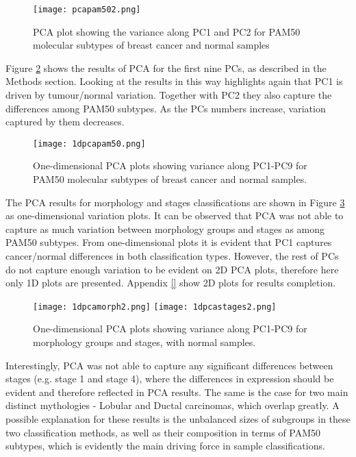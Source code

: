             \begin{figure}[!h]
            \centering
            \texttt{[image: pcapam502.png]} 
            \caption{PCA plot showing the variance along PC1 and PC2 for PAM50 molecular subtypes of breast cancer and normal samples}
            \label{fig:pcapam50}
            \end{figure}
            
    \newpage
    Figure \ref{fig:1dpcapam50} shows the results of PCA for the first nine PCs, as described in the Methods section. Looking at the results in this way highlights again that PC1 is driven by tumour/normal variation. Together with PC2 they also capture the differences among PAM50 subtypes. As the PCs numbers increase, variation captured by them decreases. 
    
            \begin{figure}[!h]
            \centering
            \texttt{[image: 1dpcapam50.png]}
            \caption{One-dimensional PCA plots showing variance along PC1-PC9 for PAM50 molecular subtypes of breast cancer and normal samples. }
            \label{fig:1dpcapam50}
            \end{figure}
    
    
    The PCA results for morphology and stages classifications are shown in Figure \ref{fig:1dpcamorphstage} as one-dimensional variation plots. It can be observed that PCA was not able to capture as much variation between morphology groups and stages as among PAM50 subtypes. From one-dimensional plots it is evident that PC1 captures cancer/normal differences in both classification types. However, the rest of PCs do not capture enough variation to be evident on 2D PCA plots, therefore here only 1D plots are presented. Appendix \ref{} show 2D plots for results completion.    
    
            
            \begin{figure}[!h]
            \texttt{[image: 1dpcamorph2.png]}\hfill
            \texttt{[image: 1dpcastages2.png]}
            \caption{One-dimensional PCA plots showing variance along PC1-PC9 for morphology groups and stages, with normal samples.}
            \label{fig:1dpcamorphstage}
            \end{figure}
            
    
    \newpage
    Interestingly, PCA was not able to capture any significant differences between stages (e.g. stage 1 and stage 4), where the differences in expression should be evident and therefore reflected in PCA results. The same is the case for two main distinct mythologies - Lobular and Ductal carcinomas, which overlap greatly. A possible explanation for these results is the unbalanced sizes of subgroups in these two classification methods, as well as their composition in terms of PAM50 subtypes, which is evidently the main driving force in sample classifications. 
    
